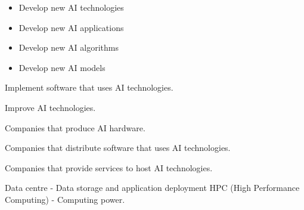 \documentclass[12pt letter]{report}
\begin{document}
\begin{itemize}
  \item Develop new AI technologies
  \item Develop new AI applications
  \item Develop new AI algorithms
  \item Develop new AI models
\end{itemize}


Implement software that uses AI technologies.


Improve AI technologies.


Companies that produce AI hardware.


Companies that distribute software that uses AI technologies.


Companies that provide services to host AI technologies.

Data centre - Data storage and application deployment
HPC (High Performance Computing) - Computing power.
\end{document}
